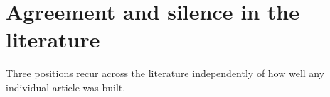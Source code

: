
\section{Agreement and silence in the literature}
\label{sec:agreement}

Three positions recur across the literature independently of how well any individual article was built.

